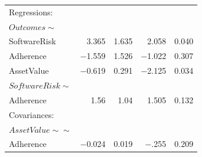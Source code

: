 \begin{table}
\begin{center}
\begin{tabular}{l|rrrr}
			Regressions:  & & & & \\  
			$Outcomes \sim$         & & & & \\                                     
			SoftwareRisk   &  3.365 &   1.635 & 2.058 &   0.040 \\
			Adherence       &  $-$1.559  & 1.526  &  $-$1.022  &  0.307\\
			AssetValue     &   $-0$.619  &  0.291  &  $-$2.125 &   0.034\\
			$SoftwareRisk \sim$        & & & & \\                                  
			Adherence     &    1.56 &   1.04  &  1.505 &   0.132\\
			Covariances:  & & & & \\  
			$AssetValue \sim\sim$          & & & & \\                                 
			Adherence     &    $-$0.024 &   0.019  &  $-$.255 &   0.209\\
		\end{tabular}
	\end{center}
\end{table}


